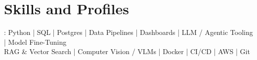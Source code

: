 \documentclass[]{jack-resume}
\begin{document}
\pagecolor{darkmodeBackground}

%
%



%
%
\begin{minipage}[t][1cm][t]{.03\textwidth}
    \hfill
\end{minipage}






\section{Skills and Profiles}
:
Python \hfill | \hfill
SQL \hfill | \hfill
Postgres \hfill | \hfill
Data Pipelines \hfill | \hfill
Dashboards \hfill | \hfill
LLM / Agentic Tooling \hfill | \hfill
Model Fine-Tuning \\
\hspace{1.0cm} RAG \& Vector Search \hfill | \hfill
Computer Vision / VLMs \hfill | \hfill
Docker \hfill | \hfill
CI/CD \hfill | \hfill
AWS \hfill | \hfill
Git \\
\end{document}
